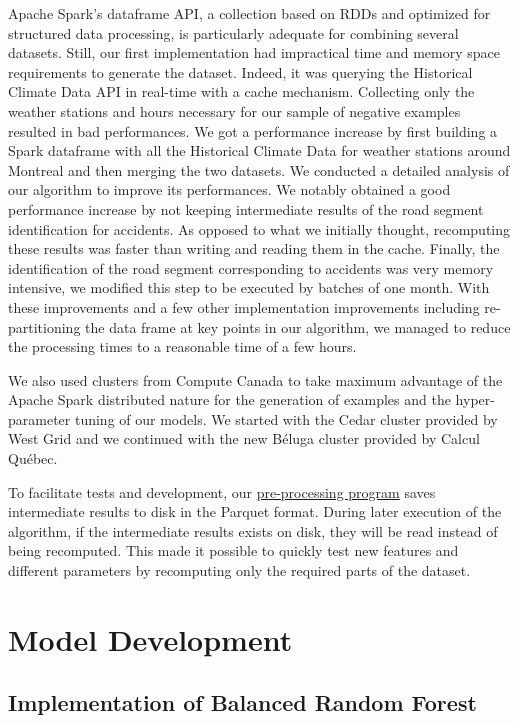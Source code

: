 \documentclass[conference]{IEEEtran}
\begin{document}
Apache Spark's dataframe API, a collection based on RDDs and optimized for 
structured data processing, is particularly adequate for
combining several datasets. Still, our first implementation had impractical
time and memory space requirements to generate the dataset. Indeed, it was querying
the Historical Climate Data API in real-time with a cache mechanism.
Collecting only the weather stations and hours necessary for our
sample of negative examples resulted in bad performances. We got a
performance increase by first building a Spark dataframe with all the
Historical Climate Data for weather stations around Montreal and then
merging the two datasets. We conducted a detailed analysis of our algorithm
to improve its performances. We notably obtained a good performance
increase by not keeping intermediate results of the road segment
identification for accidents. As opposed to what we initially thought,
recomputing these results was faster than writing and reading them in the
cache. Finally, the identification of the road segment corresponding to
accidents was very memory intensive, we modified this step to be executed
by batches of one month. With these improvements and a few other implementation improvements
including re-partitioning the data frame at key points in our algorithm, we
managed to reduce the processing times to a reasonable time of a few hours.

We also used clusters from Compute Canada to take maximum advantage of the Apache Spark distributed nature for the generation of examples and the hyper-parameter tuning of our models. We started with the Cedar cluster provided by West Grid and we continued with the new B\'eluga cluster provided by Calcul Québec.

To facilitate tests and development, our \href{https://github.com/big-data-lab-team/accident-prediction-montreal/blob/master/src/preprocess.py}{pre-processing program} saves intermediate results to disk in the Parquet format. During later execution of the algorithm, if the intermediate results exists on disk, they will be read instead of being recomputed. This made it possible to quickly test new features and different parameters by recomputing only the required parts of the dataset.

\section{Model Development}
\label{sec:modeldev}

\subsection{Implementation of Balanced Random Forest}
\end{document}
